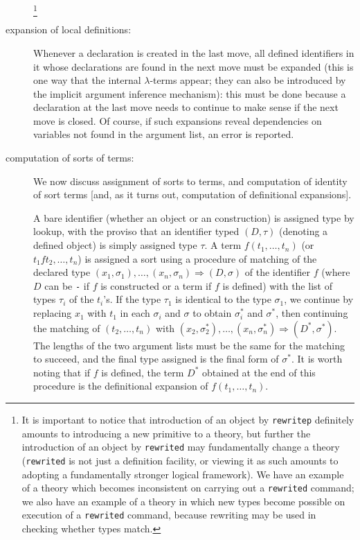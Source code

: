 \documentclass[12pt]{article}
\begin{document}
\begin{description}
\footnote{It is important to notice that introduction of an object by {\tt rewritep} definitely amounts to introducing a new primitive to a theory, but further the introduction of an object by {\tt rewrited} may fundamentally change a theory ({\tt rewrited} is not just a definition facility, or viewing it as such amounts to adopting a fundamentally stronger logical framework).  We have an example of a theory which becomes inconsistent on carrying out a {\tt rewrited} command;  we also have an example of a theory in which new types become possible on execution of a {\tt rewrited} command, because rewriting may be used in checking whether types match.}

\item[expansion of local definitions:]  Whenever a declaration is created in the last move, all defined identifiers in it whose declarations are found in the next move must be expanded (this is one
way that the internal $\lambda$-terms appear; they can also be introduced by the implicit argument inference mechanism):  this must be done because a declaration at the last move needs to continue to make sense if the next move is closed.
Of course, if such expansions reveal dependencies on variables not found in the argument list, an error is reported.

\item[computation of sorts of terms:]  We now discuss assignment of sorts to terms, and computation of identity of sort terms [and, as it turns out, computation of definitional expansions].

A bare identifier (whether an object or an construction) is assigned type by lookup, with the proviso that an identifier typed $(D,\tau)$ (denoting a defined object) is
simply assigned type $\tau$.   A term $f(t_1,\ldots,t_n)$ (or $t_1 f t_2,\ldots,t_n$) is assigned a sort using a procedure of matching of the declared type
$(x_1,\sigma_1),\ldots,(x_n,\sigma_n) \Rightarrow (D,\sigma)$ of the identifier $f$ (where $D$ can be {\tt -} if $f$ is constructed or a term if $f$ is defined) with the list of types $\tau_i$ of the $t_i$'s.
If the type $\tau_1$ is identical to the type $\sigma_1$, we continue by replacing $x_1$ with $t_1$ in each $\sigma_i$ and $\sigma$ to obtain $\sigma_i^*$ and $\sigma^*$,
then continuing the matching of $(t_2,\ldots,t_n)$ with $(x_2,\sigma^*_2),\ldots,(x_n,\sigma^*_n)\Rightarrow (D^*,\sigma^*)$.  The lengths of the two argument lists must be the same
for the matching to succeed, and the final type assigned is the final form of $\sigma^*$.  It is worth noting that if $f$ is defined, the term $D^*$ obtained at the end of this procedure is the definitional expansion of $f(t_1,\ldots,t_n)$.


\end{description}
\end{document}
